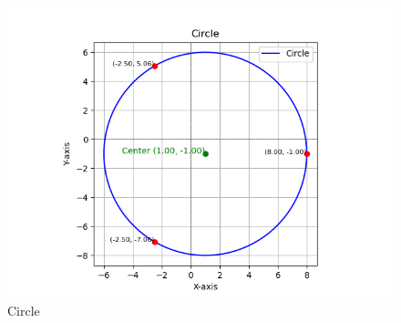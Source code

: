 \documentclass[journal]{IEEEtran}
\begin{document}
\begin{figure}[h!]
   \centering
   \includegraphics[width=0.7\linewidth]{figs/circle.png}
	\caption{Circle}
   \end{figure}
\end{document}
